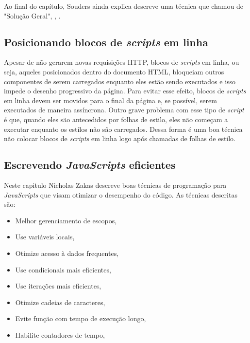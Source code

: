 Ao final do capítulo, Souders ainda explica descreve uma técnica que chamou de "Solução Geral", , \cite[p.~59]{EvenFaster}.

\subsection{Posicionando blocos de \textit{scripts} em linha}
\label{subsec:evenfaster_cap6}
Apesar de não gerarem novas requisições HTTP, blocos de \textit{scripts} em linha, ou seja, aqueles posicionados dentro do documento HTML, bloqueiam outros componentes de serem carregados enquanto eles estão sendo executados e isso impede o desenho progressivo da página. Para evitar esse efeito, blocos de \textit{scripts} em linha devem ser movidos para o final da página e, se possível, serem executados de maneira assíncrona. Outro grave problema com esse tipo de \textit{script} é que, quando eles são antecedidos por folhas de estilo, eles não começam a executar enquanto os estilos não são carregados. Dessa forma é uma boa técnica não colocar blocos de \textit{scripts} em linha logo após chamadas de folhas de estilo.

\subsection{Escrevendo \textit{JavaScripts} eficientes}
\label{subsec:evenfaster_cap7}
Neste capitulo Nicholas Zakas descreve boas técnicas de programação para \textit{JavaScripts} que visam otimizar o desempenho do código. As técnicas descritas são:

\begin{itemize}
	\item Melhor gerenciamento de escopos, \cite[p.79]{EvenFaster}
	\item Use variáveis locais, \cite[p.~81]{EvenFaster}
	\item Otimize acesso à dados frequentes, \cite[p.~85]{EvenFaster}
	\item Use condicionais mais eficientes, \cite[p.~89]{EvenFaster}
	\item Use iterações mais eficientes, \cite[p.~93]{EvenFaster}
	\item Otimize cadeias de caracteres, \cite[p.~99]{EvenFaster}
	\item Evite função com tempo de execução longo, \cite[p.~102]{EvenFaster}
	\item Habilite contadores de tempo, \cite[p.~103]{EvenFaster}
\end{itemize}

